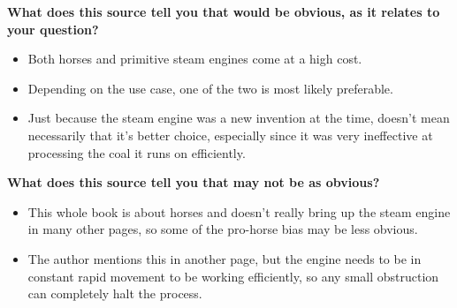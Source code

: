 

\textbf{What does this source tell you that would be obvious, as it relates to your question?}
\begin{itemize}
    \item Both horses and primitive steam engines come at a high cost.
    \item Depending on the use case, one of the two is most likely preferable.
    \item Just because the steam engine was a new invention at the time, doesn't mean necessarily that it's better choice, especially since it was very ineffective at processing the coal it runs on efficiently.
    \\
\end{itemize}

\textbf{What does this source tell you that may not be as obvious?}
\begin{itemize}
    \item This whole book is about horses and doesn't really bring up the steam engine in many other pages, so some of the pro-horse bias may be less obvious.
    \item The author mentions this in another page, but the engine needs to be in constant rapid movement to be working efficiently, so any small obstruction can completely halt the process.
\end{itemize}